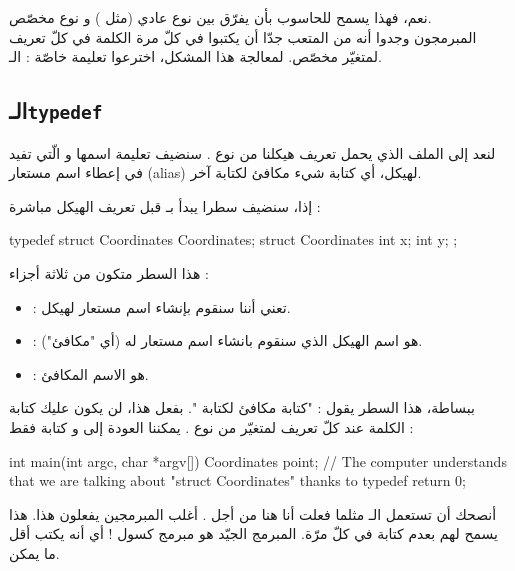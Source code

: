 نعم، فهذا يسمح للحاسوب بأن يفرّق بين نوع عادي (مثل
)
و نوع مخصّص.\\
المبرمجون وجدوا أنه من المتعب جدّا أن يكتبوا في كلّ مرة الكلمة
في كلّ تعريف لمتغيّر مخصّص.
لمعالجة هذا المشكل، اخترعوا تعليمة خاصّة : الـ.

\subsection{الـ\texttt{typedef}}

لنعد إلى الملف
الذي يحمل تعريف هيكلنا من نوع
.
سنضيف تعليمة اسمها
و الّتي تفيد في إعطاء اسم مستعار
(\textenglish{alias})
لهيكل، أي كتابة شيء مكافئ لكتابة آخر.

إذا، سنضيف سطرا يبدأ بـ
قبل تعريف الهيكل مباشرة :

\begin{Csource}
typedef struct Coordinates Coordinates;
struct Coordinates
{
	int x;
	int y;
};
\end{Csource}

هذا السطر متكون من ثلاثة أجزاء :

\begin{itemize}
  \item {} :
  تعني أننا سنقوم بإنشاء اسم مستعار لهيكل.
  \item {} :
  هو اسم الهيكل الذي سنقوم بانشاء اسم مستعار له (أي "مكافئ").
  \item {} :
  هو الاسم المكافئ.
\end{itemize}

ببساطة، هذا السطر يقول : "كتابة
مكافئ لكتابة
".
بفعل هذا، لن يكون عليك كتابة الكلمة
عند كلّ تعريف لمتغيّر من نوع
.
يمكننا العودة إلى
و كتابة فقط :

\begin{Csource}
int main(int argc, char *argv[])
{
	 Coordinates point; // The computer understands that we are talking about "struct Coordinates" thanks to typedef
   return 0;
}
\end{Csource}

أنصحك أن تستعمل الـ
مثلما فعلت أنا هنا من أجل
.
أغلب المبرمجين يفعلون هذا. هذا يسمح لهم بعدم كتابة
في كلّ مرّة. المبرمج الجيّد هو مبرمج كسول ! أي أنه يكتب أقل ما يمكن.

